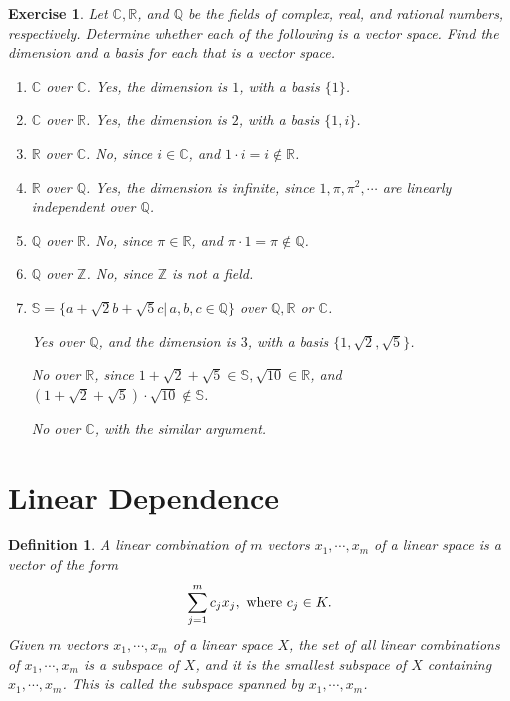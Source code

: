\documentclass[10pt]{book}
\newtheorem{definition}{Definition}[chapter]
\newtheorem{exercise}{Exercise}[section]
\theoremstyle{definition}
\numberwithin{equation}{chapter}
\begin{document}
\medskip

\begin{exercise}\label{ex_6}{\rm \cite{1}}
Let $\mathbb{C},\mathbb{R}$, and $\mathbb{Q}$ be the fields of complex, real, and rational numbers, respectively. Determine whether each of the following is a vector space. Find the dimension and a basis for each that is a vector space.
\begin{enumerate}[label=(\alph*)]
    \item $\mathbb{C}$ over $\mathbb{C}$. Yes, the dimension is $1$, with a basis $\{1\}$.
    \item $\mathbb{C}$ over $\mathbb{R}$. Yes, the dimension is $2$, with a basis $\{1, i\}$.
    \item $\mathbb{R}$ over $\mathbb{C}$. No, since $i\in\mathbb{C}$, and $1\cdot i = i\notin\mathbb{R}$.
    \item $\mathbb{R}$ over $\mathbb{Q}$. Yes, the dimension is infinite, since $1,\pi,\pi^2,\cdots$ are linearly independent over $\mathbb{Q}$.
    \item $\mathbb{Q}$ over $\mathbb{R}$. No, since $\pi\in\mathbb{R}$, and $\pi\cdot 1 = \pi\notin\mathbb{Q}$.
    \item $\mathbb{Q}$ over $\mathbb{Z}$. No, since $\mathbb{Z}$ is not a field.
    \item $\mathbb{S} = \{a+\sqrt{2}b+\sqrt{5}c|\, a,b,c\in\mathbb{Q}\}$ over $\mathbb{Q},\mathbb{R}$ or $\mathbb{C}$. 
    
    Yes over $\mathbb{Q}$, and the dimension is $3$, with a basis $\{1,\sqrt{2},\sqrt{5}\}$. 
    
    No over $\mathbb{R}$, since $1+\sqrt{2}+\sqrt{5}\in\mathbb{S}, \sqrt{10}\in\mathbb{R}$, and $(1+\sqrt{2}+\sqrt{5})\cdot \sqrt{10}\notin\mathbb{S}$.
    
    No over $\mathbb{C}$, with the similar argument.
\end{enumerate}
\end{exercise}

\medskip

\section{Linear Dependence}

\begin{definition}
A linear combination of $m$ vectors $x_1,\cdots, x_m$ of a linear space is a vector of the form
\begin{align*}
    \sum^m_{j=1} c_j x_j, \,\,{\rm where}\,\, c_j \in K.
\end{align*}
Given $m$ vectors $x_1,\cdots, x_m$ of a linear space $X$, the set of all linear combinations of $x_1,\cdots, x_m$ is a subspace of $X$, and it is the smallest subspace of $X$
containing $x_1,\cdots, x_m$. This is called the subspace spanned by $x_1,\cdots, x_m$.
\end{definition}
\end{document}
